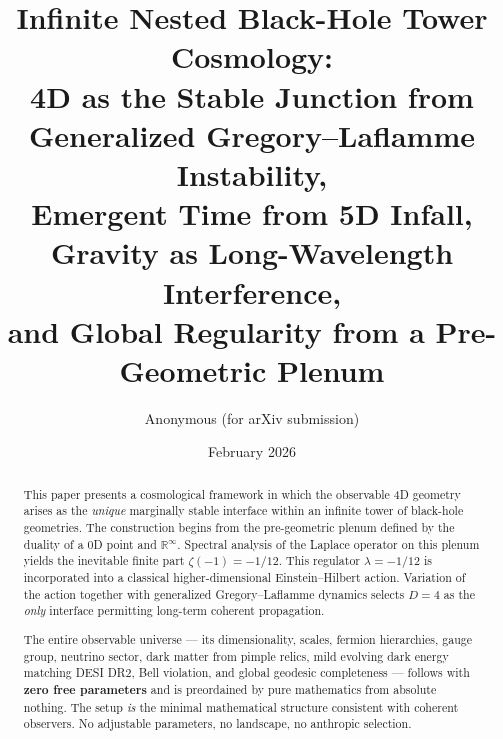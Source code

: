 \documentclass[11pt,a4paper,oneside]{article}
\title{Infinite Nested Black-Hole Tower Cosmology: \\
4D as the Stable Junction from Generalized Gregory–Laflamme Instability, \\
Emergent Time from 5D Infall, Gravity as Long-Wavelength Interference, \\
and Global Regularity from a Pre-Geometric Plenum}
\author{Anonymous (for arXiv submission)}
\date{February 2026}
\begin{document}
\maketitle

\begin{abstract}
This paper presents a cosmological framework in which the observable 4D geometry arises as the \emph{unique} marginally stable interface within an infinite tower of black-hole geometries. The construction begins from the pre-geometric plenum defined by the duality of a 0D point and $\mathbb{R}^\infty$. Spectral analysis of the Laplace operator on this plenum yields the inevitable finite part $\zeta(-1) = -1/12$. This regulator $\lambda = -1/12$ is incorporated into a classical higher-dimensional Einstein–Hilbert action. Variation of the action together with generalized Gregory–Laflamme dynamics selects $D=4$ as the \emph{only} interface permitting long-term coherent propagation. 

The entire observable universe — its dimensionality, scales, fermion hierarchies, gauge group, neutrino sector, dark matter from pimple relics, mild evolving dark energy matching DESI DR2, Bell violation, and global geodesic completeness — follows with \textbf{zero free parameters} and is preordained by pure mathematics from absolute nothing. The setup \emph{is} the minimal mathematical structure consistent with coherent observers. No adjustable parameters, no landscape, no anthropic selection.
\end{abstract}
\bigskip
\end{document}
